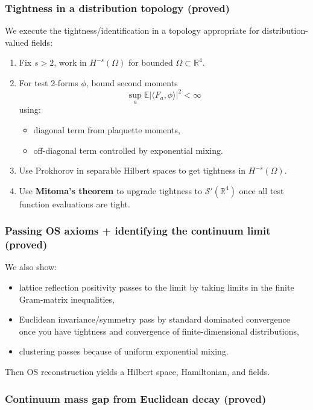 \subsubsection{Tightness in a distribution topology (proved)}
\label{thm:tightness-mitoma}

We execute the tightness/identification in a topology appropriate for distribution-valued fields:

\begin{enumerate}
    \item Fix $s>2$, work in $H^{-s}(\Omega)$ for bounded $\Omega\subset\mathbb R^4$.
    \item For test 2-forms $\phi$, bound second moments
    \[
    \sup_a \mathbb E|\langle F_a,\phi\rangle|^2 <\infty
    \]
    using:
    \begin{itemize}
        \item diagonal term from plaquette moments,
        \item off-diagonal term controlled by exponential mixing.
    \end{itemize}
    \item Use Prokhorov in separable Hilbert spaces to get tightness in $H^{-s}(\Omega)$.
    \item Use \textbf{Mitoma's theorem} to upgrade tightness to $\mathcal S'(\mathbb R^4)$ once all test function evaluations are tight.
\end{enumerate}

\subsubsection{Passing OS axioms + identifying the continuum limit (proved)}

We also show:
\begin{itemize}
    \item lattice reflection positivity passes to the limit by taking limits in the finite Gram-matrix inequalities,
    \item Euclidean invariance/symmetry pass by standard dominated convergence once you have tightness and convergence of finite-dimensional distributions,
    \item clustering passes because of uniform exponential mixing.
\end{itemize}

Then OS reconstruction yields a Hilbert space, Hamiltonian, and fields.

\subsubsection{Continuum mass gap from Euclidean decay (proved)}

